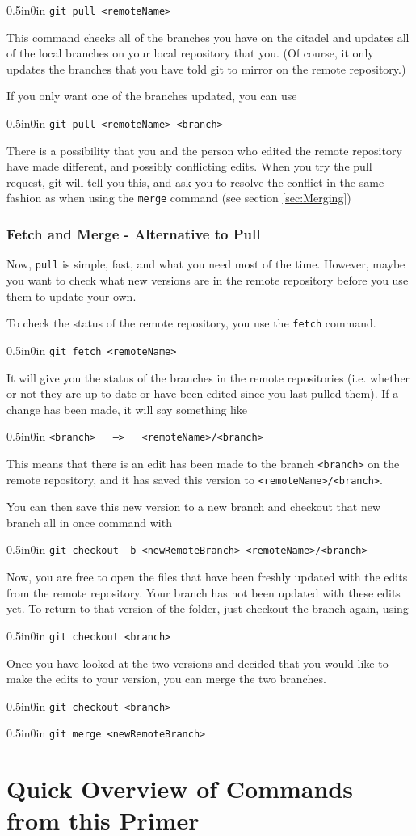 \documentclass[11pt]{article}
\newcommand{\code}[1]{\begin{adjustwidth}{0.5in}{0in}
    \texttt{#1}
    \end{adjustwidth}}
\begin{document}
\code{git pull <remoteName>}

This command checks all of the branches you have on the citadel and updates all of the local branches on your local repository that you.  (Of course, it only updates the branches that you have told git to mirror on the remote repository.)

If you only want one of the branches updated, you can use

\code{git pull <remoteName> <branch>}

There is a possibility that you and the person who edited the remote repository have made different, and possibly conflicting edits.  When you try the pull request, git will tell you this, and ask you to resolve the conflict in the same fashion as when using the \texttt{merge} command (see section \ref{sec:Merging})

\subsubsection{Fetch and Merge - Alternative to Pull}

Now, \texttt{pull} is simple, fast, and what you need most of the time.  However, maybe you want to check what new versions are in the remote repository before you use them to update your own.  

To check the status of the remote repository, you use the \texttt{fetch} command.

\code{git fetch <remoteName>}

It will give you the status of the branches in the remote repositories (i.e. whether or not they are up to date or have been edited since you last pulled them).  If a change has been made, it will say something like

\code{<branch> \ \ --> \ \ <remoteName>/<branch>}

This means that there is an edit has been made to the branch \texttt{<branch>} on the remote repository, and it has saved this version to \texttt{<remoteName>/<branch>}.

You can then save this new version to a new branch and checkout that new branch all in once command with

\code{git checkout -b <newRemoteBranch> <remoteName>/<branch>}

Now, you are free to open the files that have been freshly updated with the edits from the remote repository.  Your branch has not been updated with these edits yet.  To return to that version of the folder, just checkout the branch again, using
\code{git checkout <branch>}

Once you have looked at the two versions and decided that you would like to make the edits to your version, you can merge the two branches.  

\code{git checkout <branch>}
\code{git merge <newRemoteBranch>}

\section{Quick Overview of Commands from this Primer}
\end{document}
